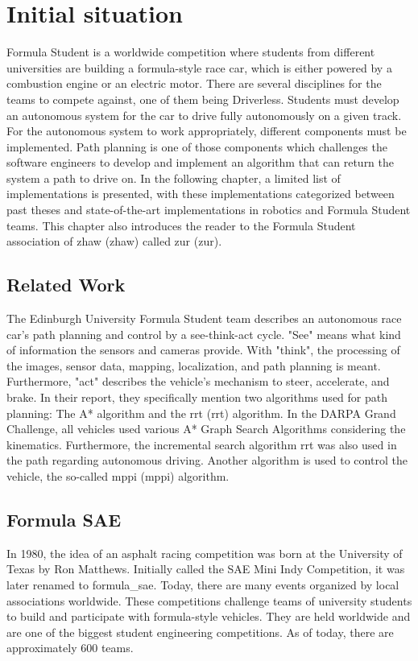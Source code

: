 \section{Initial situation} \label{sec:Initial situation}
Formula Student is a worldwide competition where students from different universities are building a formula-style race car, which is either powered by a combustion engine or an electric motor. There are several disciplines for the teams to compete against, one of them being Driverless. Students must develop an autonomous system for the car to drive fully autonomously on a given track. For the autonomous system to work appropriately, different components must be implemented. Path planning is one of those components which challenges the software engineers to develop and implement an algorithm that can return the system a path to drive on. In the following chapter, a limited list of implementations is presented, with these implementations categorized between past theses and state-of-the-art implementations in robotics and Formula Student teams. This chapter also introduces the reader to the Formula Student association of \acrlong{zhaw} (\acrshort{zhaw}) called \acrlong{zur} (\acrshort{zur}).

\subsection{Related Work} \label{sec:Related Work}
The Edinburgh University Formula Student team describes an autonomous race car's path planning and control by a see-think-act cycle. "See" means what kind of information the sensors and cameras provide. With "think", the processing of the images, sensor data, mapping, localization, and path planning is meant. Furthermore, "act" describes the vehicle's mechanism to steer, accelerate, and brake.
In their report, they specifically mention two algorithms used for path planning: The A* algorithm and the \acrlong{rrt} (\acrshort{rrt}) algorithm. In the DARPA Grand Challenge, all vehicles used various A* Graph Search Algorithms considering the kinematics. Furthermore, the incremental search algorithm \acrshort{rrt} was also used in the path regarding autonomous driving.
Another algorithm is used to control the vehicle, the so-called \acrlong{mppi} (\acrshort{mppi}) algorithm.
\cite{path_planning_and_control_georgiev} \cite{darpa_grand_challenge} %

\subsection{Formula SAE}
In 1980, the idea of an asphalt racing competition was born at the University of Texas by Ron Matthews. Initially called the SAE Mini Indy Competition, it was later renamed to \Gls{formula_sae}. Today, there are many events organized by local associations worldwide.
\cite{formula_sae}
These competitions challenge teams of university students to build and participate with formula-style vehicles. They are held worldwide and are one of the biggest student engineering competitions. As of today, there are approximately 600 teams. \cite{sae_student_events}

